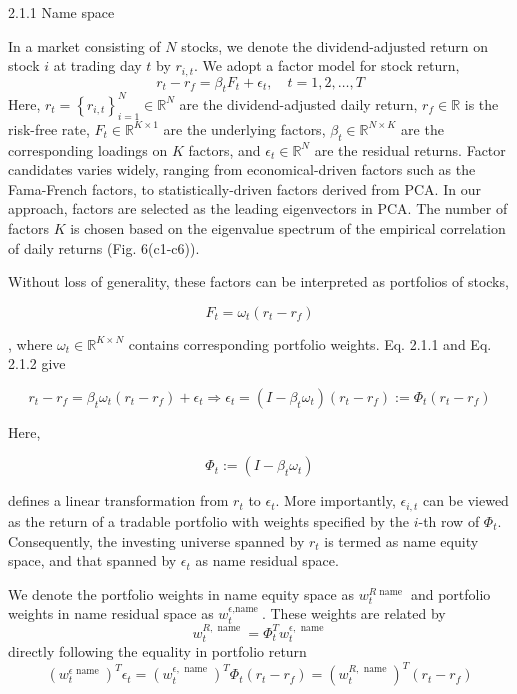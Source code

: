 \documentclass[12pt,article]{memoir}
\begin{document}
2.1.1 Name space

In a market consisting of $N$ stocks, we denote the dividend-adjusted return on stock $i$ at trading day $t$ by $r_{i, t}$. We adopt a factor model for stock return,
$$
r_t-r_f=\beta_t F_t+\epsilon_t, \quad t=1,2, \ldots, T
$$
Here, $r_t=\left\{r_{i, t}\right\}_{i=1}^N \in \mathbb{R}^N$ are the dividend-adjusted daily return, $r_f \in \mathbb{R}$ is the risk-free rate, $F_t \in \mathbb{R}^{K \times 1}$ are the underlying factors, $\beta_t \in \mathbb{R}^{N \times K}$ are the corresponding loadings on $K$ factors, and $\epsilon_t \in \mathbb{R}^N$ are the residual returns. Factor candidates varies widely, ranging from economical-driven factors such as the Fama-French factors, to statistically-driven factors derived from PCA. In our approach, factors are selected as the leading eigenvectors in PCA. The number of factors $K$ is chosen based on the eigenvalue spectrum of the empirical correlation of daily returns (Fig. 6(c1-c6)).

Without loss of generality, these factors can be interpreted as portfolios of stocks,

$$
F_t=\omega_t\left(r_t-r_f\right)
$$

, where $\omega_t \in \mathbb{R}^{K \times N}$ contains corresponding portfolio weights. Eq. 2.1.1 and Eq. 2.1.2 give

$$
r_t-r_f=\beta_t \omega_t\left(r_t-r_f\right)+\epsilon_t \Rightarrow \epsilon_t=\left(I-\beta_t \omega_t\right)\left(r_t-r_f\right):=\Phi_t\left(r_t-r_f\right)
$$

Here,

$$
\Phi_t:=\left(I-\beta_t \omega_t\right)
$$

defines a linear transformation from $r_t$ to $\epsilon_t$. More importantly, $\epsilon_{i, t}$ can be viewed as the return of a tradable portfolio with weights specified by the $i$-th row of $\Phi_t$. Consequently, the investing universe spanned by $r_t$ is termed as name equity space, and that spanned by $\epsilon_t$ as name residual space.

We denote the portfolio weights in name equity space as $w_t^{R \text { name }}$ and portfolio weights in name residual space as $w_t^{\epsilon \text {,name }}$. These weights are related by
$$
w_t^{R, \text { name }}=\Phi_t^T w_t^{\epsilon, \text { name }}
$$
directly following the equality in portfolio return
$$
\left(w_t^{\epsilon \text { name }}\right)^T \epsilon_t=\left(w_t^{\epsilon, \text { name }}\right)^T \Phi_t\left(r_t-r_f\right)=\left(w_t^{R, \text { name }}\right)^T\left(r_t-r_f\right)
$$
\end{document}

